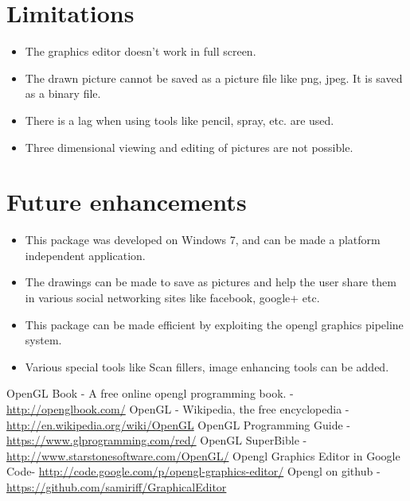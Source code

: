 \documentclass[12pt]{report}
\begin{document}
\section{Limitations}
\begin{itemize}
\item{}The graphics editor doesn't work in full screen.
\item{} The drawn picture cannot be saved as a picture file like png, jpeg. It is saved as  a binary file.
\item{}	There is a lag when using tools like pencil, spray, etc. are used.
\item{}	Three dimensional viewing and editing of pictures are not possible. 
\end{itemize}

\section{Future enhancements}
\begin{itemize}
\item{} This package was developed on Windows 7, and can be made a platform independent application.
\item{}	The drawings can be made to save as pictures and help the user share them in various social networking sites like facebook, google+ etc.
\item{}	This package can be made efficient by exploiting the opengl graphics pipeline system.
\item{}Various special tools like Scan fillers, image enhancing tools can be added.

\end{itemize}

\newpage

\begin{thebibliography}{refs}
OpenGL Book - A free online opengl programming book.  -\url{http://openglbook.com/}
OpenGL - Wikipedia, the free encyclopedia - \url{http://en.wikipedia.org/wiki/OpenGL}
 OpenGL Programming Guide  - \url{https://www.glprogramming.com/red/}
OpenGL SuperBible - \url{http://www.starstonesoftware.com/OpenGL/}
 Opengl Graphics Editor in Google Code- \url{http://code.google.com/p/opengl-graphics-editor/}
Opengl on github - \url{https://github.com/samiriff/GraphicalEditor}

\end{thebibliography}
\end{document}
